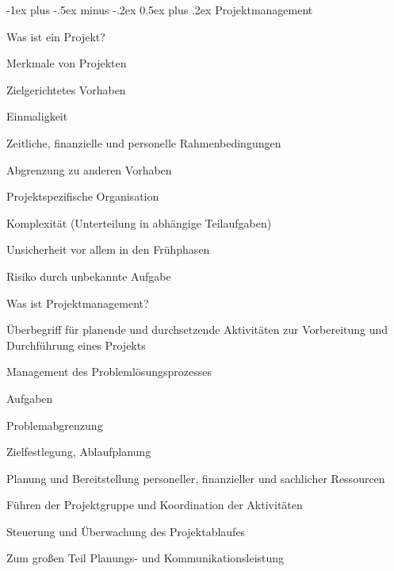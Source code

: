 \documentclass[a4paper]{article}
\makeatletter
\renewcommand{\section}{\@startsection{section}{1}{0mm}%
                                {-1ex plus -.5ex minus -.2ex}%
                                {0.5ex plus .2ex}%
                                {\normalfont\large\bfseries}}
\makeatother
\begin{document}
\begin{multicols}{3}
  \newpage
  \section{Projektmanagement}

  Was ist ein Projekt?
  \begin{itemize*}
    \item Merkmale von Projekten
    \begin{itemize*}
      \item Zielgerichtetes Vorhaben
      \item Einmaligkeit
      \item Zeitliche, finanzielle und personelle Rahmenbedingungen
      \item Abgrenzung zu anderen Vorhaben
      \item Projektspezifische Organisation
      \item Komplexität (Unterteilung in abhängige Teilaufgaben)
    \end{itemize*}
    \item Unsicherheit vor allem in den Frühphasen
    \item Risiko durch unbekannte Aufgabe
  \end{itemize*}

  Was ist Projektmanagement?
  \begin{itemize*}
    \item Überbegriff für planende und durchsetzende Aktivitäten zur Vorbereitung und Durchführung eines Projekts
    \item Management des Problemlösungsprozesses
    \item Aufgaben
    \begin{itemize*}
      \item Problemabgrenzung
      \item Zielfestlegung, Ablaufplanung
      \item Planung und Bereitstellung personeller, finanzieller und sachlicher Ressourcen
      \item Führen der Projektgruppe und Koordination der Aktivitäten
      \item Steuerung und Überwachung des Projektablaufes
      \item Zum großen Teil Planungs- und Kommunikationsleistung
    \end{itemize*}
  \end{itemize*}


\end{multicols}
\end{document}
